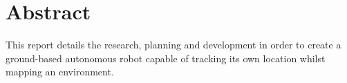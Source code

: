 \chapter{Abstract}

This report details the research, planning and development in order to create a ground-based autonomous robot capable of tracking its own location whilst mapping an environment.




